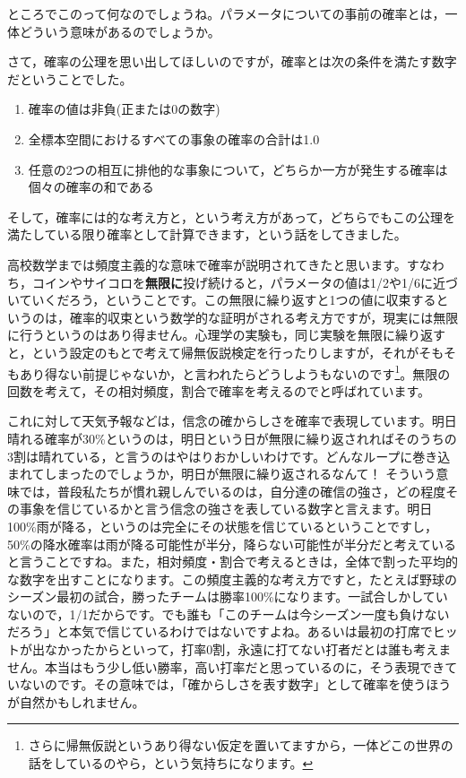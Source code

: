 \documentclass{ltjsbook}
\begin{document}
ところでこのって何なのでしょうね。パラメータについての事前の確率とは，一体どういう意味があるのでしょうか。

さて，確率の公理を思い出してほしいのですが，確率とは次の条件を満たす数字だということでした。
\begin{enumerate}
	\item 確率の値は非負(正または0の数字)
	\item 全標本空間におけるすべての事象の確率の合計は1.0
	\item 任意の2つの相互に排他的な事象について，どちらか一方が発生する確率は個々の確率の和である
\end{enumerate}
そして，確率には的な考え方と，という考え方があって，どちらでもこの公理を満たしている限り確率として計算できます，という話をしてきました。

高校数学までは頻度主義的な意味で確率が説明されてきたと思います。すなわち，コインやサイコロを\textbf{無限に}投げ続けると，パラメータの値は1/2や1/6に近づいていくだろう，ということです。この無限に繰り返すと1つの値に収束するというのは，確率的収束という数学的な証明がされる考え方ですが，現実には無限に行うというのはあり得ません。心理学の実験も，同じ実験を無限に繰り返すと，という設定のもとで考えて帰無仮説検定を行ったりしますが，それがそもそもあり得ない前提じゃないか，と言われたらどうしようもないのです\footnote{さらに帰無仮説というあり得ない仮定を置いてますから，一体どこの世界の話をしているのやら，という気持ちになります。}。無限の回数を考えて，その相対頻度，割合で確率を考えるのでと呼ばれています。

これに対して天気予報などは，信念の確からしさを確率で表現しています。明日晴れる確率が30\%というのは，明日という日が無限に繰り返されればそのうちの3割は晴れている，と言うのはやはりおかしいわけです。どんなループに巻き込まれてしまったのでしょうか，明日が無限に繰り返されるなんて！
そういう意味では，普段私たちが慣れ親しんでいるのは，自分達の確信の強さ，どの程度その事象を信じているかと言う信念の強さを表している数字と言えます。明日100\%雨が降る，というのは完全にその状態を信じているということですし，50\%の降水確率は雨が降る可能性が半分，降らない可能性が半分だと考えていると言うことですね。また，相対頻度・割合で考えるときは，全体で割った平均的な数字を出すことになります。この頻度主義的な考え方ですと，たとえば野球のシーズン最初の試合，勝ったチームは勝率100\%になります。一試合しかしていないので，1/1だからです。でも誰も「このチームは今シーズン一度も負けないだろう」と本気で信じているわけではないですよね。あるいは最初の打席でヒットが出なかったからといって，打率0割，永遠に打てない打者だとは誰も考えません。本当はもう少し低い勝率，高い打率だと思っているのに，そう表現できていないのです。その意味では，「確からしさを表す数字」として確率を使うほうが自然かもしれません。
\end{document}

